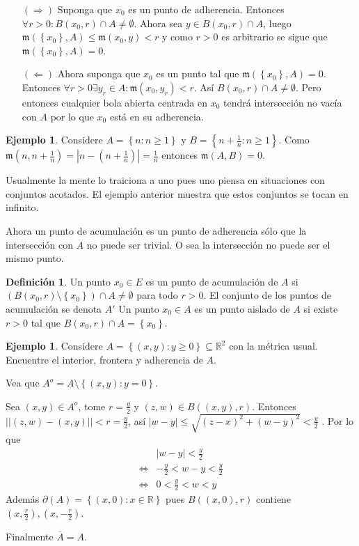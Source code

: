 \documentclass[12pt]{article}
\theoremstyle{plain}
\theoremstyle{definition}
\newtheorem{Def}[Th]{Definición}       %
\newtheorem{Ex}[Th]{Ejemplo}               %
\theoremstyle{remark}
\numberwithin{equation}{section}
\newcommand{\bR}{\mathbb{R}}        %
\newcommand{\mm}{\mathfrak{m}}      %
\renewcommand{\geq}{\geqslant}      %
\renewcommand{\leq}{\leqslant}      %
\renewcommand{\:}{\colon}           %
\newcommand{\conj}[1]{\left\lbrace#1\right\rbrace}
\begin{document}
\begin{multicols}{2}
\begin{ptcb}
\begin{enumerate}
  \item[$(\Rightarrow)$] Suponga que $x_0$ es un punto de adherencia. Entonces $\forall r>0\colon B(x_0,r)\cap A\neq \emptyset$. Ahora sea $y\in B(x_0,r)\cap A$, luego $\mm(\conj{x_0},A)\leq\mm(x_0,y)< r$ y como $r>0$ es arbitrario se sigue que  $\mm(\conj{x_0},A)=0$.
  \item[$(\Leftarrow)$]Ahora suponga que $x_0$ es un punto tal que $\mm(\conj{x_0},A)=0$. Entonces $\forall r>0\exists y_r\in A\colon \mm(x_0,y_r)<r$. Así $B(x_0,r)\cap A\neq \emptyset$. Pero entonces cualquier bola abierta centrada en $x_0$ tendrá intersección no vacía con $A$ por lo que $x_0$ está en su adherencia.
\end{enumerate}
\end{ptcb}
\begin{Ex}
  Considere $A=\conj{n\colon n\geq 1}$ y $B=\conj{n+\frac{1}{n}\colon n\geq 1}$. Como $\mm(n,n+\frac{1}{n})=|n-(n+\frac{1}{n})|=\frac{1}{n}$ entonces $\mm(A,B)=0$.
\end{Ex}
Usualmente la mente lo traiciona a uno pues uno piensa en situaciones con conjuntos acotados. El ejemplo anterior muestra que estos conjuntos se tocan en infinito.\par
Ahora un punto de acumulación es un punto de adherencia sólo que la intersección con $A$ no puede ser trivial. O sea la intersección no puede ser el mismo punto.
\begin{Def}
  Un punto $x_0\in E$ es un punto de acumulación de $A$ si $\left(B(x_0,r)\setminus\conj{x_0}\right)\cap A \neq \emptyset$ para todo $r>0$. El conjunto de los puntos de acumulación se denota $A'$
  Un punto $x_0\in A$ es un punto aislado de $A$ si existe $r>0$ tal que $B(x_0,r)\cap A =\conj{x_0}$.
\end{Def}

\begin{Ex}
  Considere $A=\conj{(x,y)\colon y\geq 0}\subseteq \bR^2$ con la métrica usual. Encuentre el interior, frontera y adherencia de $A$.
   \end{Ex}

   \begin{ptcb}
   Vea que $A^o=A\setminus\conj{(x,y)\colon y=0}$.\par
    Sea $(x,y)\in A^o$, tome $r=\frac{y}{2}$ y $(z,w)\in B\left((x,y),r\right)$. Entonces $||(z,w)-(x,y)||<r=\frac{y}{2}$, así $|w-y|\leq\sqrt{(z-x)^2+(w-y)^2}<\frac{y}{2}$ .
  Por lo que
  \begin{align*}
    &|w-y| <\frac{y}{2} \\
    \iff & -\frac{y}{2}<w-y<\frac{y}{2} \\
    \iff & 0<\frac{y}{2}<w<y
  \end{align*}
  Además $\partial(A)=\conj{(x,0)\colon x\in\bR}$ pues $B\left((x,0),r\right)$ contiene $(x,\frac{r}{2}), (x,-\frac{r}{2})$.\par
  Finalmente $\overline{A}=A$.
\end{ptcb}


\end{multicols}
\end{document}
